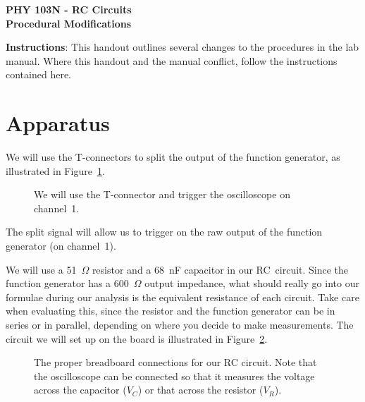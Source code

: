 \documentclass[12pt]{article}
\begin{document}
\begin{center}
{\LARGE \bf PHY 103N - RC Circuits} \\
\vspace*{3mm}
{\large \bf Procedural Modifications}
\end{center}

\noindent
{\bf Instructions}: 
This handout outlines several changes to the procedures in
the lab manual. Where this handout and the manual conflict, follow the 
instructions contained here.

\section{Apparatus}

We will use the T-connectors to split the output of the function generator, as
illustrated in Figure~\ref{fig:wiring}.
\begin{figure}[htb]
\epsfxsize=8cm
\centerline{}
\caption{We will use the T-connector and trigger the oscilloscope on 
channel~1.}
\label{fig:wiring}
\end{figure}
The split signal will allow us to trigger on the raw output of the function 
generator (on channel~1).

We will use a 51~$\Omega$ resistor and a 68~nF capacitor in our RC~circuit.
Since the function generator has a 600~$\Omega$ output impedance, what should
really go into our formulae during our analysis is the equivalent resistance 
of each circuit. Take care when evaluating this, since the resistor and the
function generator can be in series or in parallel, depending on where you 
decide to make measurements. The circuit we will set up on the board is 
illustrated in Figure~\ref{fig:rcboard}.
\begin{figure}[htb]
\epsfxsize=15cm
\centerline{}
\caption{The proper breadboard connections for our RC circuit. Note that the
oscilloscope can be connected so that it measures the voltage across the 
capacitor ($V_C$) or that across the resistor ($V_R$).}
\label{fig:rcboard}
\end{figure}
\clearpage
\end{document}
